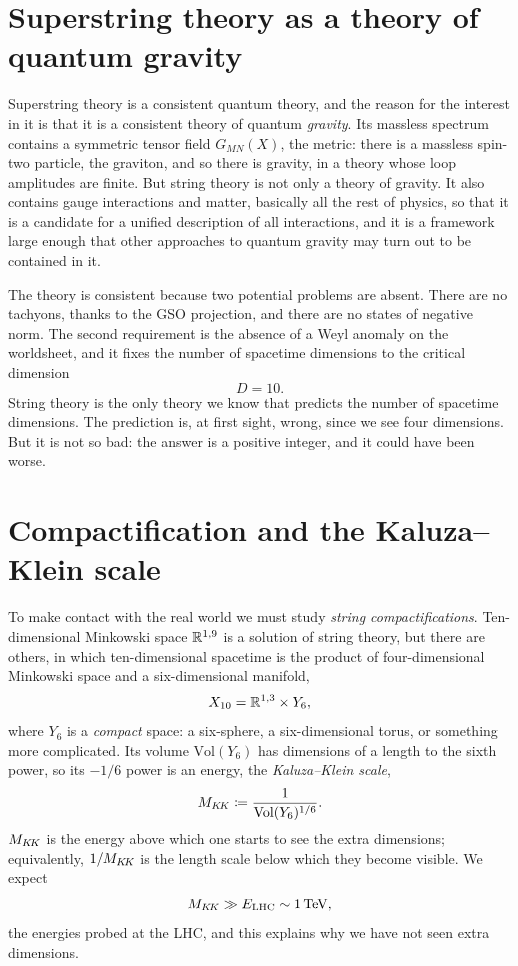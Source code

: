 \section{Superstring theory as a theory of quantum gravity}
\label{sec:L1-qg}

Superstring theory is a consistent quantum theory, and the reason for the interest in it is that it is a consistent theory of quantum \emph{gravity}. Its massless spectrum contains a symmetric tensor field $G_{MN}(X)$, the metric: there is a massless spin-two particle, the graviton, and so there is gravity, in a theory whose loop amplitudes are finite. But string theory is not only a theory of gravity. It also contains gauge interactions and matter, basically all the rest of physics, so that it is a candidate for a unified description of all interactions, and it is a framework large enough that other approaches to quantum gravity may turn out to be contained in it.

The theory is consistent because two potential problems are absent. There are no tachyons, thanks to the GSO projection, and there are no states of negative norm. The second requirement is the absence of a Weyl anomaly on the worldsheet, and it fixes the number of spacetime dimensions to the critical dimension
\begin{equation}
  D = 10 .
  \label{eq:L1-D10}
\end{equation}
String theory is the only theory we know that predicts the number of spacetime dimensions. The prediction is, at first sight, wrong, since we see four dimensions. But it is not so bad: the answer is a positive integer, and it could have been worse.

\section{Compactification and the Kaluza--Klein scale}
\label{sec:L1-KK}

To make contact with the real world we must study \emph{string compactifications}. Ten-dimensional Minkowski space $\mathbb{R}^{1,9}$ is a solution of string theory, but there are others, in which ten-dimensional spacetime is the product of four-dimensional Minkowski space and a six-dimensional manifold,
\begin{equation}
  X_{10} = \mathbb{R}^{1,3}\times Y_6 ,
  \label{eq:L1-X10}
\end{equation}
where $Y_6$ is a \emph{compact} space: a six-sphere, a six-dimensional torus, or something more complicated. Its volume $\mathrm{Vol}(Y_6)$ has dimensions of a length to the sixth power, so its $-1/6$ power is an energy, the \emph{Kaluza--Klein scale},
\begin{equation}
  M_{K\!K} \coloneqq \frac{1}{\mathrm{Vol}(Y_6)^{1/6}} .
  \label{eq:L1-MKK-def}
\end{equation}
$M_{K\!K}$ is the energy above which one starts to see the extra dimensions; equivalently, $1/M_{K\!K}$ is the length scale below which they become visible. We expect
\begin{equation*}
  M_{K\!K} \gg E_{\mathrm{LHC}} \sim 1\,\mathrm{TeV} ,
\end{equation*}
the energies probed at the LHC, and this explains why we have not seen extra dimensions.

